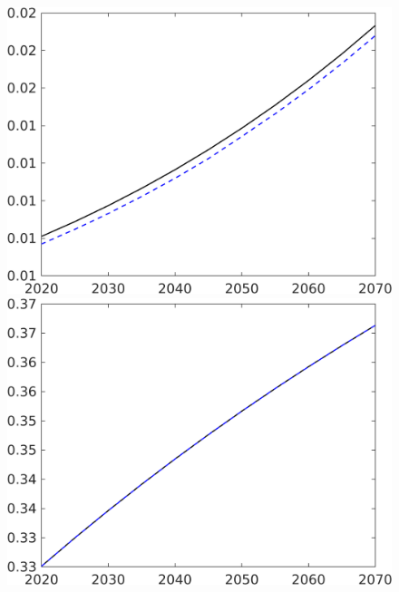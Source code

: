 \begin{figure}[h!!]
\begin{minipage}[]{0.32\textwidth}
	\end{minipage}
	\begin{minipage}[]{0.32\textwidth}
		\includegraphics[width=1\textwidth]{../../codding_model/own_basedOnFried/optimalPol_190722_tidiedUp/figures/all_10Aout22/CountTaul_modnsk_target_wsf_spillover0_sep1_extern0_PV1_etaa0.79_lgd0.png}
	\end{minipage}
	\begin{minipage}[]{0.32\textwidth}
		\includegraphics[width=1\textwidth]{../../codding_model/own_basedOnFried/optimalPol_190722_tidiedUp/figures/all_10Aout22/CountTaul_modnsk_target_pf_spillover0_sep1_extern0_PV1_etaa0.79_lgd0.png}

\end{minipage}
\end{figure}
